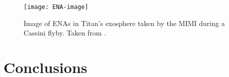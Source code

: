 \documentclass[12pt, parskip=full*, abstract]{scrartcl}
\begin{document}
\begin{figure}[htbp]
	\centering
	\texttt{[image: ENA-image]}
	\caption{Image of ENAs in Titan's exosphere taken by the MIMI during a Cassini flyby. Taken from \textcite{titan-exosphere-interaction}.}
	\label{ENA-image}
\end{figure}

 

\section{Conclusions}

\newpage
\printbibliography
\end{document}
